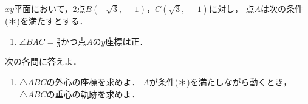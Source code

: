 \documentclass[../../main.tex]{subfiles}
\begin{document}
$xy$平面において，2点$B(-\sqrt3, \, -1)$，$C(\sqrt3, \, -1)$に対し，
点$A$は次の条件(＊)を満たすとする．
\begin{enumerate}
  \item[(＊)]$\displaystyle \angle BAC=\frac{\pi}{3}$かつ点$A$の$y$座標は正．
\end{enumerate}
次の各問に答えよ．
\begin{enumerate}
  \item$\triangle ABC$の外心の座標を求めよ．
  $A$が条件(＊)を満たしながら動くとき，$\triangle ABC$の垂心の軌跡を求めよ．
\end{enumerate}
\end{document}

